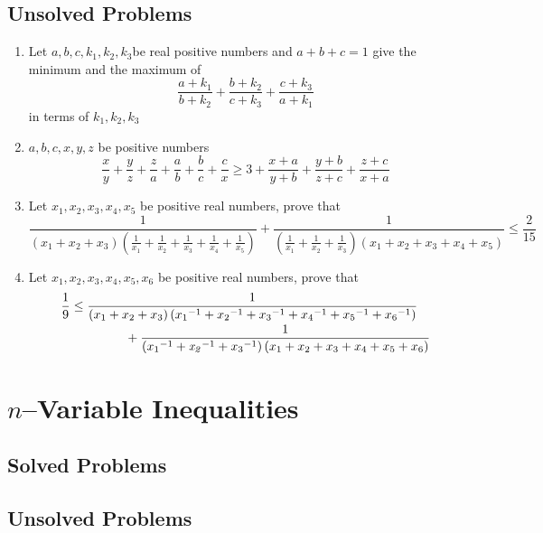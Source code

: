 \documentclass{report}
\begin{document}
\section{Unsolved Problems}
\begin{enumerate}
	\item Let $ a,b,c,k_1,k_2,k_3$be real positive numbers and $ a + b + c = 1$ give the minimum and the maximum of $$ \frac {a + k_1}{b + k_2} + \frac {b + k_2}{c + k_3} + \frac {c + k_3}{a + k_1}$$ in terms of $ k_1,k_2,k_3$
	\item $a,b,c,x,y,z$ be positive numbers\[ \frac {x}{y} + \frac {y}{z} + \frac {z}{a} + \frac {a}{b} + \frac {b}{c} + \frac {c}{x} \ge 3 + \frac {{x + a}}{{y + b}} + \frac {{y + b}}{{z + c}} + \frac {{z + c}}{{x + a}}\]
	\item Let $x_1,x_2,x_3,x_4,x_5$ be positive real numbers, prove that $$\frac{1}{(x_1+x_2+x_3)(\frac{1}{x_1}+\frac{1}{x_2}+\frac{1}{x_3}+\frac{1}{x_4}+\frac{1}{x_5})}+\frac{1}{(\frac{1}{x_1}+\frac{1}{x_2}+\frac{1}{x_3})(x_1+x_2+x_3+x_4+x_5)} \le \frac{2}{15}$$
	\item Let $x_1,x_2,x_3,x_4,x_5, x_6$ be positive real numbers, prove that$$\splitdfrac{\displaystyle{\frac{1}{9}\leq {\frac {1}{\left( { x_1} + { x_2} + { x_3} \right) \left( {{ x_1}}^{ - 1} + {{x_2}}^{ - 1} + {{ x_3}}^{ - 1} + {{x_4}}^{ - 1} + {{ x_5}}^{ - 1} + {{ x_6}}^{ - 1} \right) }}}}{+ \displaystyle{{\frac {1}{\left( {{ x_1}}^{ - 1 } + {{\it x_2}}^{ - 1} + {{ x_3}}^{ - 1} \right) \left( { x_1} + { x_2} + { x_3} + { x_4} + { x_5} + { x_6} \right) }}}} $$
\end{enumerate}
\chapter{$n$--Variable Inequalities}
\section{Solved Problems}

\section{Unsolved Problems}
\end{document}
